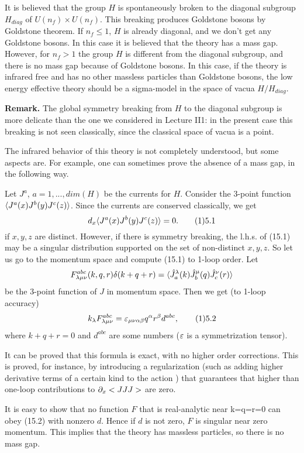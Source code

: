 It is believed that 
the group $H$ is spontaneously broken to the diagonal subgroup $H_{diag}$
of $U(n_f)\times U(n_f)$. This breaking produces Goldstone bosons by
Goldstone theorem.    
If $n_f\le 1$, $H$ is already 
diagonal, and we don't get any Goldstone bosons. 
In this case it is believed that the theory has a mass gap. 
However, for $n_f>1$ the group $H$ is different from the diagonal subgroup, 
and there is no mass gap because of Goldstone bosons. 
In this case, if the theory is infrared free and has no other 
massless particles than Goldstone bosons, the low energy effective theory 
should be a sigma-model in the space of vacua $H/H_{diag}$.  

{\bf Remark.} The global symmetry breaking from $H$ to the diagonal 
subgroup is more delicate than the one we considered in Lecture II1:
in the present case this breaking is not seen classically, since the 
classical space of vacua is a point. 

The infrared behavior of this theory 
 is not completely understood, but some aspects are. 
For example, one can sometimes prove the absence of a mass gap, in the
following way. 

Let $J^a$, $a=1,...,dim(H)$ be the currents for $H$. Consider the 
3-point function 
$\langle J^a(x)J^b(y)J^c(z)\rangle$. Since the currents are conserved classically, 
we get 
$$
d_x\<J^a(x)J^b(y)J^c(z)\>=0.\tag 15.1
$$  
if $x,y,z$ are distinct. However, if there is symmetry breaking, 
the l.h.s. of (15.1) 
may be a singular distribution supported on the set of non-distinct $x,y,z$. 
So let us go to the momentum space and compute (15.1) to 1-loop order. 
Let 
$$
F_{\lambda\mu\nu}^{abc}(k,q,r)\delta(k+q+r)=
\langle\hat J_a^\lambda(k)\hat J_b^\mu(q)
\hat J_c^\nu(r)\rangle
$$ 
be the 3-point function of $J$ in momentum space. 
Then we get (to 1-loop accuracy)
$$
k_\l F_{\l\mu\nu}^{abc}=\e_{\mu\nu\alpha\beta}q^\alpha r^\beta d^{abc},\tag 
15.2
$$
where $k+q+r=0$ and $d^{abc}$ are some numbers 
($\varepsilon$ is a symmetrization tensor). 

It can be proved that this formula is exact, with no higher
order corrections.  This is proved, for instance, by introducing a 
regularization (such as adding higher derivative terms of a certain kind 
to the action ) that guarantees that higher than one-loop contributions
to $\partial_x<JJJ>$ are zero.  

It is easy to show that no function
$F$ that is real-analytic near k=q=r=0 can obey (15.2) with nonzero $d$. Hence
if $d$ is not zero, $F$ is singular near zero momentum.  This implies that
the theory has massless particles, so there is no mass gap.

